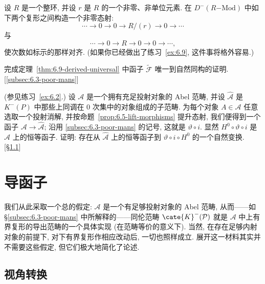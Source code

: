\begin{prob}\label{ex:6.11}
设 $R$ 是一个整环, 并设 $r$ 是 $R$ 的一个非零、非单位元素. 在 $D^{-}(R\mathrm{-Mod})$ 中如下两个复形之间构造一个非零态射:
\[
\cdots\longrightarrow 0\longrightarrow 0\longrightarrow R/(r)\longrightarrow 0\longrightarrow\cdots
\]
与
\[
\cdots\longrightarrow 0\longrightarrow R\longrightarrow 0\longrightarrow 0\longrightarrow\cdots,
\]
使次数如标示的那样对齐. (如果你已经做出了练习~\ref{ex:6.9}, 这件事将格外容易.)
\end{prob}

\begin{prob}\label{ex:6.12}
完成定理~\ref{thm:6.9-derived-universal} 中函子 $\widetilde{\mathcal F}$ 唯一到自然同构的证明. [\ref{subsec:6.3-poor-mans}]
\end{prob}

\begin{prob}\label{ex:6.13}
(参见练习~\ref{ex:6.2}.) 设 $\mathcal{A}$ 是一个拥有充足投射对象的 Abel 范畴, 并设 $\widehat{\mathcal A}$ 是 $K^{-}(P)$ 中那些上同调在 $0$ 次集中的对象组成的子范畴. 为每个对象 $A\in\mathcal{A}$ 任意选取一个投射消解, 并按命题~\ref{prop:6.5-lift-morphisms} 提升态射, 我们便得到一个函子 $\mathcal{A}\to\widehat{\mathcal A}$; 沿用 \ref{subsec:6.3-poor-mans} 的记号, 这就是 $\vartheta\circ i$. 显然 $H^0\circ\vartheta\circ i$ 是 $\mathcal{A}$ 上的恒等函子. 证明: 存在从 $\widehat{\mathcal A}$ 上的恒等函子到 $\vartheta\circ i\circ H^0$ 的一个自然变换. [\S\ref{subsec:7.1-viewpoint}]
\end{prob}


\section{导函子}
\label{sec:derived-functors}

我们从此采取一个总的假定: $\mathcal{A}$ 是一个有足够投射对象的 Abel 范畴, 从而——如 \S\ref{subsec:6.3-poor-mans} 中所解释的——同伦范畴 $\cate{K}^-(\mathcal{P})$ 就是 $\mathcal{A}$ 中上有界复形的导出范畴的一个具体实现 (在范畴等价的意义下). 当然, 在存在足够内射对象的前提下, 对下有界复形作相应改动后, 一切也照样成立. 展开这一材料其实并不需要这些假定, 但它们极大地简化了论述.

\subsection{视角转换}
\label{subsec:7.1-viewpoint}

